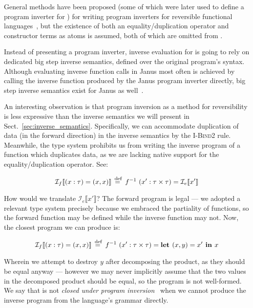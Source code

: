 General methods have been proposed (some of which were later used to define a
program inverter for \rfun) for writing program inverters for reversible
functional languages~\cite{Gluck:2003, Kawabe:2005}, but the existence of both
an equality/duplication operator and constructor terms as atoms is assumed,
both of which are omitted from \rfunc.

Instead of presenting a program inverter, inverse evaluation for \rfunc is
going to rely on dedicated big step inverse semantics, defined over the
original program's syntax. Although evaluating inverse function calls in Janus
most often is achieved by calling the inverse function produced by the Janus
program inverter directly, big step inverse semantics exist for Janus as
well~\cite{Paolini:2018}.

An interesting observation is that program inversion as a method for
reversibility is less expressive than the inverse semantics we will present in
Sect.~\ref{sec:inverse_semantics}. Specifically, we can accommodate duplication
of data (in the forward direction) in the inverse semantics by the
\textsc{I-Bind2} rule. Meanwhile, the type system prohibits us from writing the
inverse program of a function which duplicates data, as we are lacking native
support for the equality/duplication operator. See:

\begin{align*}
  \mathcal{I}_f \llbracket (x:\tau) = (x, x) \rrbracket \stackrel{\>\text{def}}{=}\>
  f^{-1}~(x': \tau \times \tau) = \mathcal{I}_e \llbracket x' \rrbracket
\end{align*}

How would we translate $\mathcal{I}_e \llbracket x' \rrbracket$? The forward
program is legal --- we adopted a relevant type system precisely because we
embraced the partiality of functions, so the forward function may be defined
while the inverse function may not. Now, the closest program we can produce is:

\begin{align*}
  \mathcal{I}_f \llbracket (x:\tau) = (x, x) \rrbracket \stackrel{\>\text{def}}{=}\>
  f^{-1}~(x': \tau \times \tau) = \textbf{let } (x, y) = x' \textbf{ in } x
\end{align*}

Wherein we attempt to destroy $y$ after decomposing the product, as they should
be equal anyway --- however we may never implicitly assume that the two values
in the decomposed product should be equal, so the program is not well-formed.
We say that \rfunc is not \emph{closed under program
inversion}~\cite{Kaarsgaard:2017} when we cannot produce the inverse program
from the language's grammar directly.

